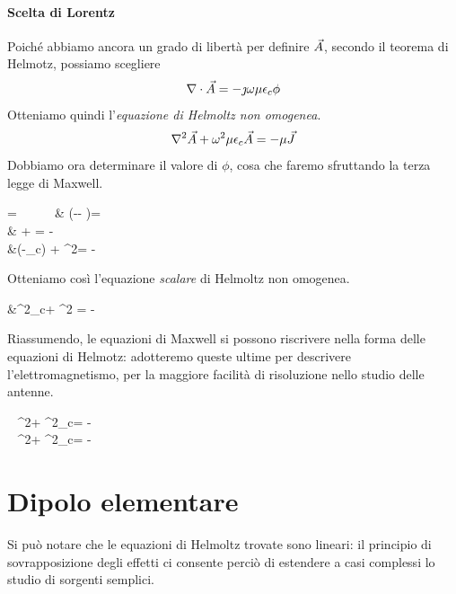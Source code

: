\paragraph{Scelta di Lorentz}
Poiché abbiamo ancora un grado di libertà per definire $\vec{A}$, secondo il teorema di Helmotz, possiamo scegliere
\begin{equation}
	\nabla\cdot \vec{A} = -\jmath \omega \mu \epsilon_c \phi
\end{equation}
Otteniamo quindi l'\emph{equazione di Helmoltz non omogenea}.
\begin{equation}
	\nabla^2\vec{A} + \omega^2 \mu\epsilon_c\vec{A} =-\mu \vec{J}
\end{equation}
Dobbiamo ora determinare il valore di $\phi$, cosa che faremo sfruttando la terza legge di Maxwell.
\begin{esp*}
	\diverg\E
		= \frac{\rho}{\epsilon} ~~ \implies ~~ &
		\diverg\left(-\jmath \omega \A - \nabla \phi	 \right)= \frac{\rho}{\epsilon}\\
	 & \jmath \omega \A + \nabla \phi= -\frac{\rho}{\epsilon}	 \\
	&\jmath\omega\left(-\jmath \omega\mu\epsilon_c\phi\right) + \nabla^2\phi = - \frac{\rho}{\epsilon}\\
\end{esp*}

Otteniamo così l'equazione \emph{scalare} di Helmoltz non omogenea.
\begin{esp*}
	&\omega^2\mu\epsilon_c\phi + \nabla^2 \phi = -\frac{\rho}{\epsilon}
\end{esp*}

Riassumendo, le equazioni di Maxwell si possono riscrivere nella forma delle equazioni di Helmotz: adotteremo queste ultime per descrivere l'elettromagnetismo, per la maggiore facilità di risoluzione nello studio delle antenne.

\begin{esp}\label{eq:helmolts-lorentz}
	\begin{dcases}
		~ \nabla^2\A + \omega^2\mu\epsilon_c\A = -\mu\J \\
		~ \nabla^2\phi + \omega^2\mu\epsilon_c\phi = -\frac{\rho}{\epsilon}
	\end{dcases}
\end{esp}

\section{Dipolo elementare}
Si può notare che le equazioni di Helmoltz trovate sono lineari: il principio di sovrapposizione degli effetti ci consente perciò di estendere a casi complessi lo studio di sorgenti semplici.

